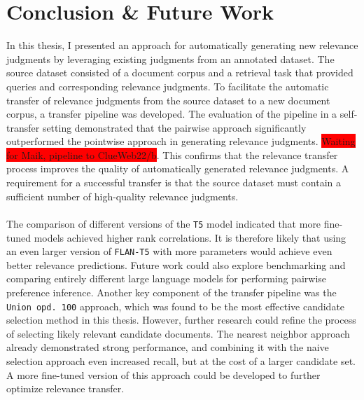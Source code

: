\chapter{Conclusion \& Future Work}\label{conclusion}

In this thesis, I presented an approach for automatically generating new relevance judgments by leveraging existing judgments from an annotated dataset. The source dataset consisted of a document corpus and a retrieval task that provided queries and corresponding relevance judgments. To facilitate the automatic transfer of relevance judgments from the source dataset to a new document corpus, a transfer pipeline was developed. The evaluation of the pipeline in a self-transfer setting demonstrated that the pairwise approach significantly outperformed the pointwise approach in generating relevance judgments. \colorbox{red}{Waiting for Maik, pipeline to ClueWeb22/b}. This confirms that the relevance transfer process improves the quality of automatically generated relevance judgments. A  requirement for a successful transfer is that the source dataset must contain a sufficient number of high-quality relevance judgments.
\\\\
The comparison of different versions of the \texttt{T5} model indicated that more fine-tuned models achieved higher rank correlations. It is therefore likely that using an even larger version of \texttt{FLAN-T5} with more parameters would achieve even better relevance predictions. Future work could also explore benchmarking and comparing entirely different large language models for performing pairwise preference inference. Another key component of the transfer pipeline was the \texttt{Union opd.\ 100} approach, which was found to be the most effective candidate selection method in this thesis. However, further research could refine the process of selecting likely relevant candidate documents. The nearest neighbor approach already demonstrated strong performance, and combining it with the naive selection approach even increased recall, but at the cost of a larger candidate set. A more fine-tuned version of this approach could be developed to further optimize relevance transfer.


